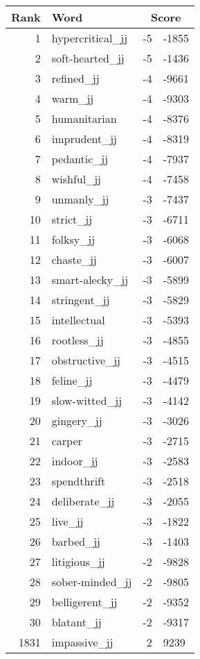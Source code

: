 \begin{longtable}[!htbp]{| rlr@{.}l |}
    \hline
    \textbf{Rank} & \textbf{Word} & \multicolumn{2}{c|}{\textbf{Score}} \\
    \hline
    \endhead
    1 & hypercritical\_jj & -5 & -1855 \\
    2 & soft-hearted\_jj & -5 & -1436 \\
    3 & refined\_jj & -4 & -9661 \\
    4 & warm\_jj & -4 & -9303 \\
    5 & humanitarian & -4 & -8376 \\
    6 & imprudent\_jj & -4 & -8319 \\
    7 & pedantic\_jj & -4 & -7937 \\
    8 & wishful\_jj & -4 & -7458 \\
    9 & unmanly\_jj & -3 & -7437 \\
    10 & strict\_jj & -3 & -6711 \\
    11 & folksy\_jj & -3 & -6068 \\
    12 & chaste\_jj & -3 & -6007 \\
    13 & smart-alecky\_jj & -3 & -5899 \\
    14 & stringent\_jj & -3 & -5829 \\
    15 & intellectual & -3 & -5393 \\
    16 & rootless\_jj & -3 & -4855 \\
    17 & obstructive\_jj & -3 & -4515 \\
    18 & feline\_jj & -3 & -4479 \\
    19 & slow-witted\_jj & -3 & -4142 \\
    20 & gingery\_jj & -3 & -3026 \\
    21 & carper & -3 & -2715 \\
    22 & indoor\_jj & -3 & -2583 \\
    23 & spendthrift & -3 & -2518 \\
    24 & deliberate\_jj & -3 & -2055 \\
    25 & live\_jj & -3 & -1822 \\
    26 & barbed\_jj & -3 & -1403 \\
    27 & litigious\_jj & -2 & -9828 \\
    28 & sober-minded\_jj & -2 & -9805 \\
    29 & belligerent\_jj & -2 & -9352 \\
    30 & blatant\_jj & -2 & -9317 \\
    1831 & impassive\_jj & 2 & 9239 \\

\end{longtable}
